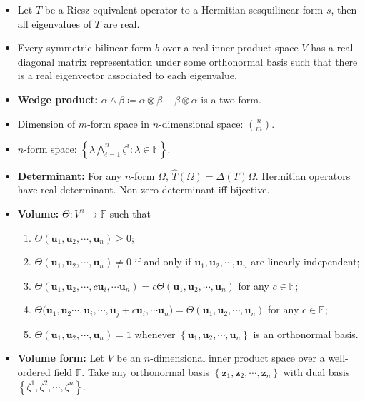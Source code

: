 \documentclass[10pt]{article}
\begin{document}
\begin{multicols*}{3}
\begin{itemize}
            \item Let $T$ be a Riesz-equivalent operator to a Hermitian sesquilinear form $s$, then all eigenvalues of $T$ are real.
            \item Every symmetric bilinear form $b$ over a real inner product space $V$ has a real diagonal matrix representation under some orthonormal basis such that there is a real eigenvector associated to each eigenvalue.
            \item \textbf{Wedge product:} $\alpha \wedge \beta \coloneqq \alpha \otimes \beta - \beta \otimes \alpha$ is a two-form.
            \item Dimension of $m$-form space in $n$-dimensional space: $\binom{n}{m}$.
            \item $n$-form space: $\left\{\lambda\bigwedge_{i = 1}^n\zeta^i \colon \lambda \in \mathbb{F}\right\}$.
            \item \textbf{Determinant:} For any $n$-form $\Omega$, $\widehat{T}(\Omega) = \Delta(T)\Omega$. Hermitian operators have real determinant. Non-zero determinant iff bijective.
            \item \textbf{Volume:} $\Theta \colon V^n \to \mathbb{F}$ such that 
            \begin{enumerate}
                \item $\Theta\left(\bm{u}_1, \bm{u}_2, \cdots, \bm{u}_n\right) \geq 0$;
                \item $\Theta\left(\bm{u}_1, \bm{u}_2, \cdots, \bm{u}_n\right) \neq 0$ if and only if $\bm{u}_1, \bm{u}_2, \cdots, \bm{u}_n$ are linearly independent;
                \item $\Theta\left(\bm{u}_1, \bm{u}_2, \cdots, c\bm{u}_i, \cdots \bm{u}_n\right) = c\Theta\left(\bm{u}_1, \bm{u}_2, \cdots, \bm{u}_n\right)$ for any $c \in \mathbb{F}$;
                \item $\Theta\bigl(\bm{u}_1, \bm{u}_2 \cdots, \bm{u}_i, \cdots, \bm{u}_j + c\bm{u}_i, \cdots \bm{u}_n\bigr) = \Theta\left(\bm{u}_1, \bm{u}_2, \cdots, \bm{u}_n\right)$ for any $c \in \mathbb{F}$;
                \item $\Theta\left(\bm{u}_1, \bm{u}_2, \cdots, \bm{u}_n\right) = 1$ whenever $\left\{\bm{u}_1, \bm{u}_2, \cdots, \bm{u}_n\right\}$ is an orthonormal basis.
            \end{enumerate}
            \item \textbf{Volume form:} Let $V$ be an $n$-dimensional inner product space over a well-ordered field $\mathbb{F}$. Take any orthonormal basis $\left\{\bm{z}_1, \bm{z}_2, \cdots, \bm{z}_n\right\}$ with dual basis $\left\{\zeta^1, \zeta^2, \cdots, \zeta^n\right\}$. 

\end{itemize}
\end{multicols*}
\end{document}
